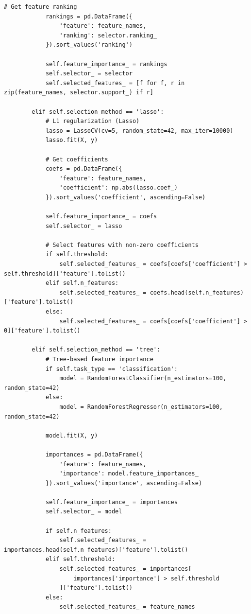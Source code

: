 \begin{lstlisting}[style=python, caption={Comprehensive Feature Selection Framework}]
            # Get feature ranking
            rankings = pd.DataFrame({
                'feature': feature_names,
                'ranking': selector.ranking_
            }).sort_values('ranking')

            self.feature_importance_ = rankings
            self.selector_ = selector
            self.selected_features_ = [f for f, r in zip(feature_names, selector.support_) if r]

        elif self.selection_method == 'lasso':
            # L1 regularization (Lasso)
            lasso = LassoCV(cv=5, random_state=42, max_iter=10000)
            lasso.fit(X, y)

            # Get coefficients
            coefs = pd.DataFrame({
                'feature': feature_names,
                'coefficient': np.abs(lasso.coef_)
            }).sort_values('coefficient', ascending=False)

            self.feature_importance_ = coefs
            self.selector_ = lasso

            # Select features with non-zero coefficients
            if self.threshold:
                self.selected_features_ = coefs[coefs['coefficient'] > self.threshold]['feature'].tolist()
            elif self.n_features:
                self.selected_features_ = coefs.head(self.n_features)['feature'].tolist()
            else:
                self.selected_features_ = coefs[coefs['coefficient'] > 0]['feature'].tolist()

        elif self.selection_method == 'tree':
            # Tree-based feature importance
            if self.task_type == 'classification':
                model = RandomForestClassifier(n_estimators=100, random_state=42)
            else:
                model = RandomForestRegressor(n_estimators=100, random_state=42)

            model.fit(X, y)

            importances = pd.DataFrame({
                'feature': feature_names,
                'importance': model.feature_importances_
            }).sort_values('importance', ascending=False)

            self.feature_importance_ = importances
            self.selector_ = model

            if self.n_features:
                self.selected_features_ = importances.head(self.n_features)['feature'].tolist()
            elif self.threshold:
                self.selected_features_ = importances[
                    importances['importance'] > self.threshold
                ]['feature'].tolist()
            else:
                self.selected_features_ = feature_names


\end{lstlisting}
